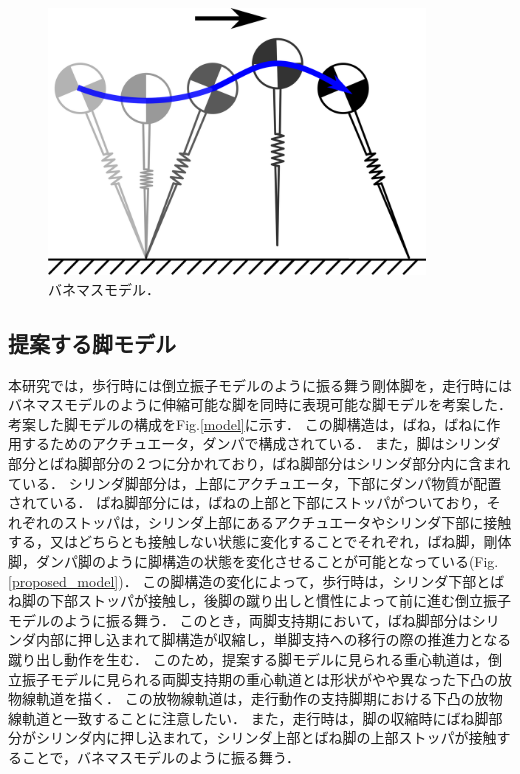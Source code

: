 \begin{figure}[htbp]
 \centering
 \includegraphics[clip,width=10.0cm]{./fig/slip_running.png}
    \caption{バネマスモデル．\label{springmass}}
\end{figure}



\subsection{提案する脚モデル}
本研究では，歩行時には倒立振子モデルのように振る舞う剛体脚を，走行時にはバネマスモデルのように伸縮可能な脚を同時に表現可能な脚モデルを考案した．
考案した脚モデルの構成をFig.\ref{model}に示す．
この脚構造は，ばね，ばねに作用するためのアクチュエータ，ダンパで構成されている．
また，脚はシリンダ部分とばね脚部分の２つに分かれており，ばね脚部分はシリンダ部分内に含まれている．
シリンダ脚部分は，上部にアクチュエータ，下部にダンパ物質が配置されている．
ばね脚部分には，ばねの上部と下部にストッパがついており，それぞれのストッパは，シリンダ上部にあるアクチュエータやシリンダ下部に接触する，又はどちらとも接触しない状態に変化することでそれぞれ，ばね脚，剛体脚，ダンパ脚のように脚構造の状態を変化させることが可能となっている(Fig.\ref{proposed_model})．
この脚構造の変化によって，歩行時は，シリンダ下部とばね脚の下部ストッパが接触し，後脚の蹴り出しと慣性によって前に進む倒立振子モデルのように振る舞う．
このとき，両脚支持期において，ばね脚部分はシリンダ内部に押し込まれて脚構造が収縮し，単脚支持への移行の際の推進力となる蹴り出し動作を生む．
このため，提案する脚モデルに見られる重心軌道は，倒立振子モデルに見られる両脚支持期の重心軌道とは形状がやや異なった下凸の放物線軌道を描く．
この放物線軌道は，走行動作の支持脚期における下凸の放物線軌道と一致することに注意したい．
また，走行時は，脚の収縮時にばね脚部分がシリンダ内に押し込まれて，シリンダ上部とばね脚の上部ストッパが接触することで，バネマスモデルのように振る舞う．

